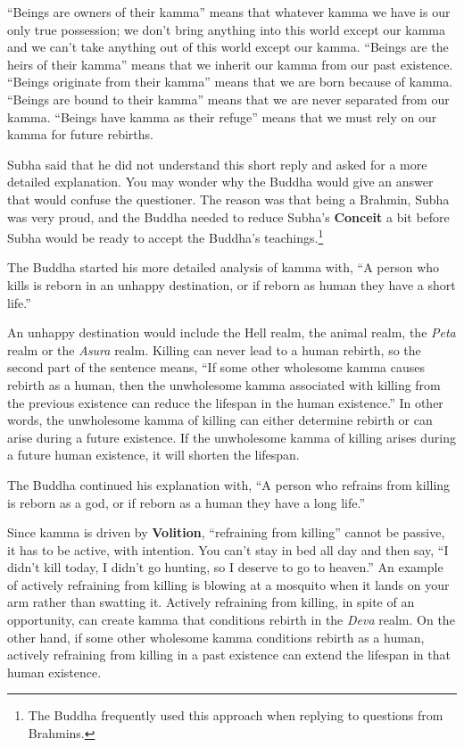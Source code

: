 “Beings are owners of their kamma” means that whatever kamma we have is our only true possession; we don’t bring anything into this world except our kamma and we can’t take anything out of this world except our kamma. “Beings are the heirs of their kamma” means that we inherit our kamma from our past existence. “Beings originate from their kamma” means that we are born because of kamma. “Beings are bound to their kamma” means that we are never separated from our kamma. “Beings have kamma as their refuge” means that we must rely on our kamma for future rebirths.

\pagebreak

Subha said that he did not understand this short reply and asked for a more detailed explanation. You may wonder why the Buddha would give an answer that would confuse the questioner. The reason was that being a Brahmin, Subha was very proud, and the Buddha needed to reduce Subha’s \textbf{Conceit} a bit before Subha would be ready to accept the Buddha’s teachings.\footnote{The Buddha frequently used this approach when replying to questions from Brahmins.}

The Buddha started his more detailed analysis of kamma with, “A person who kills is reborn in an unhappy destination, or if reborn as human they have a short life.” 

An unhappy destination would include the Hell realm, the animal realm, the \textit{Peta} realm or the \textit{Asura} realm. Killing can never lead to a human rebirth, so the second part of the sentence means, “If some other wholesome kamma causes rebirth as a human, then the unwholesome kamma associated with killing from the previous existence can reduce the lifespan in the human existence.” In other words, the unwholesome kamma of killing can either determine rebirth or can arise during a future existence. If the unwholesome kamma of killing arises during a future human existence, it will shorten the lifespan.

The Buddha continued his explanation with, “A person who refrains from killing is reborn as a god, or if reborn as a human they have a long life.” 

Since kamma is driven by \textbf{Volition}, “refraining from killing” cannot be passive, it has to be active, with intention. You can’t stay in bed all day and then say, “I didn’t kill today, I didn’t go hunting, so I deserve to go to heaven.” An example of actively refraining from killing is blowing at a mosquito when it lands on your arm rather than swatting it. Actively refraining from killing, in spite of an opportunity, can create kamma that conditions rebirth in the \textit{Deva} realm. On the other hand, if some other wholesome kamma conditions rebirth as a human, actively refraining from killing in a past existence can extend the lifespan in that human existence.

